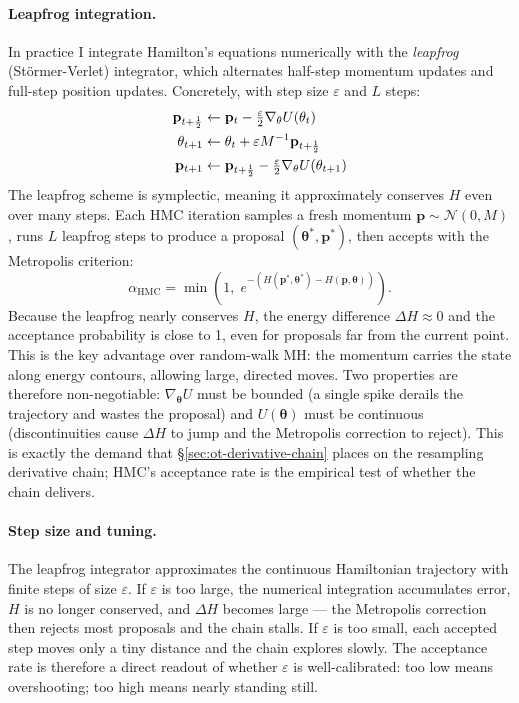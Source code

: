 \documentclass{article}
\renewcommand{\v}[1]{ \ensuremath{ {\mathbf{#1}} }}
\begin{document}
\paragraph{Leapfrog integration.}
In practice I integrate Hamilton's equations numerically with the \textit{leapfrog} (Störmer-Verlet) integrator, which alternates half-step momentum updates and full-step position updates. Concretely, with step size $\varepsilon$ and $L$ steps:
\begin{align}
    \v p_{t+\frac{1}{2}} &\leftarrow \v p_t - \tfrac{\varepsilon}{2}\nabla_{\v \theta} U(\v \theta_t) \notag \\
    \v \theta_{t+1} &\leftarrow \v \theta_t + \varepsilon M^{-1} \v p_{t+\frac{1}{2}} \notag \\
    \v p_{t+1} &\leftarrow \v p_{t+\frac{1}{2}} - \tfrac{\varepsilon}{2}\nabla_{\v \theta} U(\v \theta_{t+1}) \notag
\end{align}
The leapfrog scheme is symplectic, meaning it approximately conserves $H$ even over many steps. Each HMC iteration samples a fresh momentum $\v p \sim \mathcal{N}(0, M)$, runs $L$ leapfrog steps to produce a proposal $(\v \theta^*, \v p^*)$, then accepts with the Metropolis criterion:
\begin{equation}
    \alpha_{\mathrm{HMC}} = \min\!\left(1,\; e^{-(H(\v p^*, \v \theta^*) - H(\v p, \v \theta))}\right).
    \label{eq:hmc-acceptance}
\end{equation}
Because the leapfrog nearly conserves $H$, the energy difference $\Delta H \approx 0$ and the acceptance probability is close to 1, even for proposals far from the current point. This is the key advantage over random-walk MH: the momentum carries the state along energy contours, allowing large, directed moves. Two properties are therefore non-negotiable: $\nabla_{\boldsymbol{\theta}} U$ must be bounded (a single spike derails the trajectory and wastes the proposal) and $U(\boldsymbol{\theta})$ must be continuous (discontinuities cause $\Delta H$ to jump and the Metropolis correction to reject). This is exactly the demand that \S\ref{sec:ot-derivative-chain} places on the resampling derivative chain; HMC's acceptance rate is the empirical test of whether the chain delivers.

\paragraph{Step size and tuning.}
The leapfrog integrator approximates the continuous Hamiltonian trajectory with finite steps of size $\varepsilon$. If $\varepsilon$ is too large, the numerical integration accumulates error, $H$ is no longer conserved, and $\Delta H$ becomes large — the Metropolis correction then rejects most proposals and the chain stalls. If $\varepsilon$ is too small, each accepted step moves only a tiny distance and the chain explores slowly. The acceptance rate is therefore a direct readout of whether $\varepsilon$ is well-calibrated: too low means overshooting; too high means nearly standing still.
\end{document}
